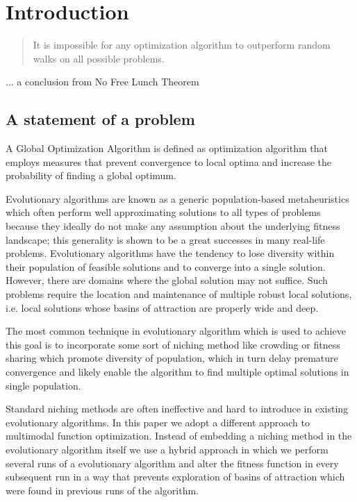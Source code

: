 
\chapter{Introduction}
\label{Introduction} 

\begin{quotation}
 It is impossible for any optimization algorithm to outperform random walks on all possible problems.
\end{quotation}
\begin{flushright}
 ... a conclusion from No Free Lunch Theorem
\end{flushright}

\section{A statement of a problem}

A Global Optimization Algorithm is defined as optimization algorithm
that employs measures that prevent convergence to local optima
and increase the probability of finding a global optimum. 

Evolutionary algorithms are known as a generic population-based metaheuristics
which often perform well approximating solutions to all
types of problems because they ideally do not make any assumption about the underlying fitness landscape; 
this generality is shown to be a great successes in many real-life problems. 
Evolutionary algorithms have the tendency to lose diversity within their
population of feasible solutions and to converge into a single solution.
However, there are domains where the global solution may not suffice. 
Such problems require the location and maintenance of multiple robust local
solutions, i.e. local solutions whose basins of attraction are properly wide and deep.

The most common technique in evolutionary algorithm which is
used to achieve this goal is to incorporate some sort of niching method
like crowding or fitness sharing which promote diversity of population,
which in turn delay premature convergence and likely enable the algorithm to
find multiple optimal solutions in single population.
 
Standard niching methods are often ineffective and hard to introduce 
in existing evolutionary algorithms. In this paper we adopt a
different approach to multimodal function optimization. Instead of
embedding a niching method in the evolutionary algorithm itself we
use a hybrid approach in which we perform several runs of a evolutionary 
algorithm and alter the fitness function in every subsequent
run in a way that prevents exploration of basins of attraction which
were found in previous runs of the algorithm.

